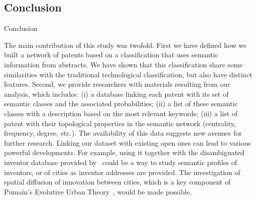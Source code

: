 %



\subsection*{Conclusion}{Conclusion}
 \label{app:subsec:discussion}

The main contribution of this study was twofold. First we have defined how we built a network of patents based on a classification that uses semantic information from abstracts. We have shown that this classification share some similarities with the traditional technological classification, but also have distinct features. Second, we provide researchers with materials resulting from our analysis, which includes: (i) a database linking each patent with its set of semantic classes and the associated probabilities; (ii) a list of these semantic classes with a description based on the most relevant keywords; (iii) a list of patent with their topological properties in the semantic network (centrality, frequency, degree, etc.). The availability of this data suggests new avenues for further research. Linking our dataset with existing open ones can lead to various powerful developments. For example, using it together with the disambiguated inventor database provided by~\cite{li2014disambiguation} could be a way to study semantic profiles of inventors, or of cities as inventor addresses are provided. The investigation of spatial diffusion of innovation between cities, which is a key component of Pumain's Evolutive Urban Theory~\cite{pumain2010theorie}, would be made possible.

